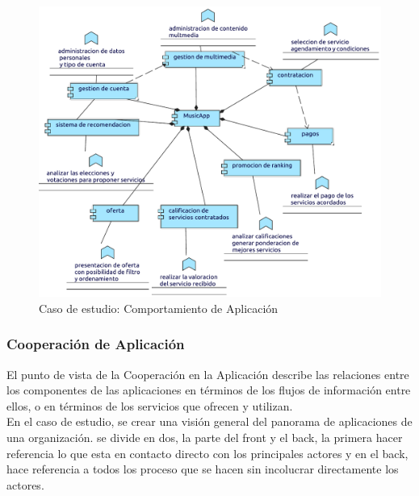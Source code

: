 \begin{figure}[h!]
	\centering
	\includegraphics[width=\linewidth]{Desarrollo/ArquitecturaEmpresarial/Aplicacion/imgs/Comportamiento.pdf}
	\caption{Caso de estudio:  Comportamiento de Aplicación}
	\label{fig:comportamiento}
\end{figure}

\newpage

\subsubsection{Cooperación de Aplicación}
El punto de vista de la Cooperación en la Aplicación describe las relaciones entre los componentes de las aplicaciones en términos de los flujos de información entre ellos, o en términos de los servicios que ofrecen y utilizan. \\

En el caso de estudio, se  crear una visión general del panorama de aplicaciones de una organización. se divide en dos, la parte del front y el back, la primera hacer referencia lo que esta en contacto directo con los principales actores y en el back, hace referencia a todos los proceso que se hacen sin incolucrar directamente los actores.
